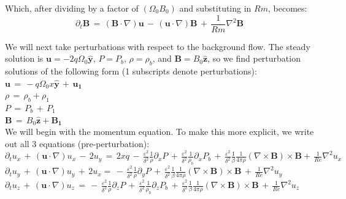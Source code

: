 \documentclass[letterpaper,12pt]{article}
\newcommand\reye{\mathrel{Re}}
\newcommand\reym{\mathrel{Rm}}
\begin{document}
Which, after dividing by a factor of $\left(\Omega_0 B_0\right)$ and substituting in $\reym$, becomes: \\

\[\partial_t\mathbf{B} \, = \, \left(\mathbf{B} \cdot \nabla \right)\mathbf{u} \, -\, \left(\mathbf{u} \cdot \nabla \right)\mathbf{B} \, + \, \frac{1}{\reym}\nabla^2\mathbf{B} \]

We will next take perturbations with respect to the background flow. The steady solution is $\mathbf{u} = -2 q \Omega_0 \mathbf{\hat{y}}$, $P = P_b$, $\rho = \rho_b$, and $\mathbf{B} = B_0 \mathbf{\hat{z}}$, so we find perturbation solutions of the following form (1 subscripts denote perturbations): \\

$\mathbf{u} \, = \, -q \Omega_0 x \mathbf{\hat{y}} \, + \, \mathbf{u_1}$ \\

$\rho \, = \, \rho_b + \rho_1$ \\

$P \, = \, P_b \, + \, P_1$ \\

$\mathbf{B} \, = \, B_0\mathbf{\hat{z}} + \mathbf{B_1}$ \\

We will begin with the momentum equation. To make this more explicit, we write out all 3 equations (pre-perturbation): \\

$\partial_t u_x \, + \, \left(\mathbf{u} \cdot \nabla\right)u_x \, - \, 2 u_y \, = \, 2 x q \, - \, \frac{\varepsilon^2}{\delta^2} \frac{1}{\rho} \partial_x P \, + \, \frac{\varepsilon^2}{\delta^2} \frac{1}{\rho_b} \partial_x P_b \, +\, \frac{\varepsilon^2}{\delta^2} \frac{1}{\beta} \frac{1}{4 \pi \rho} \left( \nabla \times \mathbf{B} \right) \times \mathbf{B} + \, \frac{1}{\reye}\nabla^2 u_x  $ \\

$\partial_t u_y \, + \, \left(\mathbf{u} \cdot \nabla\right)u_y \, + \, 2u_x =  \, - \, \frac{\varepsilon^2}{\delta^2} \frac{1}{\rho} \partial_y P \, +\, \frac{\varepsilon^2}{\delta^2} \frac{1}{\beta} \frac{1}{4 \pi \rho} \left( \nabla \times \mathbf{B} \right) \times \mathbf{B} \, + \, \frac{1}{\reye}\nabla^2 u_y  $ \\

$\partial_t u_z \, + \, \left(\mathbf{u} \cdot \nabla\right)u_z \,  =  \, - \, \frac{\varepsilon^2}{\delta^2} \frac{1}{\rho} \partial_z P \,  + \, \frac{\varepsilon^2}{\delta^2} \frac{1}{\rho_b} \partial_z P_b \, +\, \frac{\varepsilon^2}{\delta^2} \frac{1}{\beta} \frac{1}{4 \pi \rho} \left( \nabla \times \mathbf{B} \right) \times \mathbf{B} \, + \, \frac{1}{\reye}\nabla^2 u_z $ \\
\end{document}
